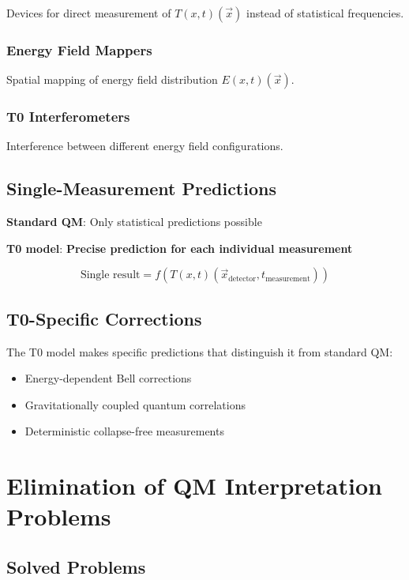 \documentclass[12pt,a4paper]{article}
\newcommand{\Tfield}{T(x,t)}
\newcommand{\Efield}{E(x,t)}
\begin{document}
	Devices for direct measurement of $\Tfield(\vec{x})$ instead of statistical frequencies.
	
	\subsubsection{Energy Field Mappers}
	
	Spatial mapping of energy field distribution $\Efield(\vec{x})$.
	
	\subsubsection{T0 Interferometers}
	
	Interference between different energy field configurations.
	
	\subsection{Single-Measurement Predictions}
	
	\textbf{Standard QM}: Only statistical predictions possible
	
	\textbf{T0 model}: \textbf{Precise prediction for each individual measurement}
	
	\begin{equation}
		\text{Single result} = f(\Tfield(\vec{x}_{\text{detector}}, t_{\text{measurement}}))
	\end{equation}
	
	\subsection{T0-Specific Corrections}
	
	The T0 model makes specific predictions that distinguish it from standard QM:
	
	\begin{itemize}
		\item Energy-dependent Bell corrections
		\item Gravitationally coupled quantum correlations
		\item Deterministic collapse-free measurements
	\end{itemize}
	
	\section{Elimination of QM Interpretation Problems}
	
	\subsection{Solved Problems}
	
\end{document}
